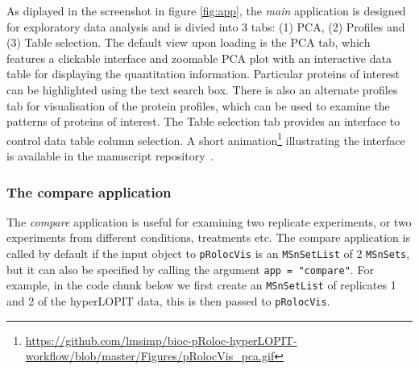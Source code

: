 As diplayed in the screenshot in figure \ref{fig:app}, the
\textit{main} application is designed for exploratory data analysis
and is divied into 3 tabs: (1) PCA, (2) Profiles and (3) Table
selection. The default view upon loading is the PCA tab, which
features a clickable interface and zoomable PCA plot with an
interactive data table for displaying the quantitation information.
Particular proteins of interest can be highlighted using the text
search box. There is also an alternate profiles tab for visualisation
of the protein profiles, which can be used to examine the patterns of
proteins of interest. The Table selection tab provides an interface to
control data table column selection. A short
animation\footnote{\url{https://github.com/lmsimp/bioc-pRoloc-hyperLOPIT-workflow/blob/master/Figures/pRolocVis\_pca.gif}}
illustrating the interface is available in the manuscript repository~\cite{ghrepo}.

\subsubsection*{The compare application}
The \textit{compare} application is useful for examining two replicate
experiments, or two experiments from different conditions, treatments
etc. The compare application is called by default if the input object
to \texttt{pRolocVis} is an \texttt{MSnSetList} of 2 \texttt{MSnSets},
but it can also be specified by calling the argument \texttt{app =
  "compare"}. For example, in the code chunk below we first create an
\texttt{MSnSetList} of replicates 1 and 2 of the hyperLOPIT data, this
is then passed to \texttt{pRolocVis}.

\begin{knitrout}
\color{fgcolor}\begin{kframe}
\begin{alltt}
 \hlkwb{<-} \hlstd{(}
  \hlstd{=} \hlstd{)}
\end{alltt}
\end{kframe}
\end{knitrout}

